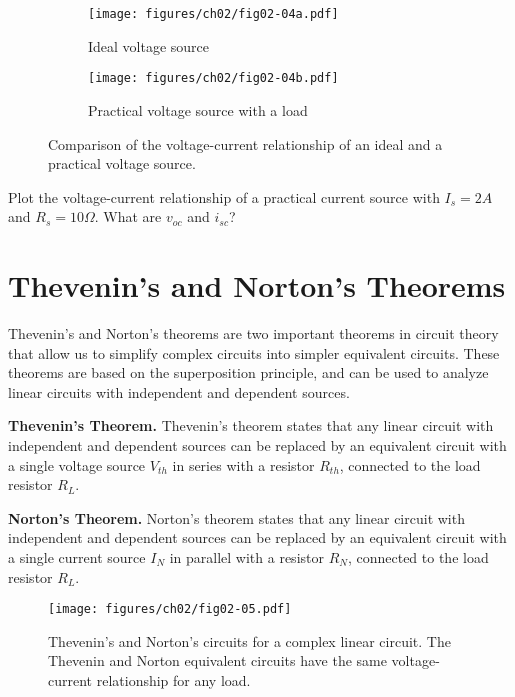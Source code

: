 \begin{figure}[t]
    \centering
    \begin{subfigure}{0.48\textwidth}
        \centering
        \texttt{[image: figures/ch02/fig02-04a.pdf]}
        \caption{Ideal voltage source}
        \label{fig:02-04a}
    \end{subfigure}
    \hfill
    \begin{subfigure}{0.48\textwidth}
        \centering
        \texttt{[image: figures/ch02/fig02-04b.pdf]}
        \caption{Practical voltage source with a load}
        \label{fig:02-04b}
    \end{subfigure}
    \caption{Comparison of the voltage-current relationship of an ideal and a practical voltage source.}
    \label{fig:02-04}
\end{figure}

\begin{boxedstuff}
    \begin{problem}
        Plot the voltage-current relationship of a practical current source with $I_s = 2A$ and $R_s = 10\Omega$. What are $v_{oc}$ and $i_{sc}$?
    \end{problem}
\end{boxedstuff}

\section{Thevenin's and Norton's Theorems}
Thevenin's and Norton's theorems are two important theorems in circuit theory that allow us to simplify complex circuits into simpler equivalent circuits. These theorems are based on the superposition principle, and can be used to analyze linear circuits with independent and dependent sources.

\noindent\textbf{Thevenin's Theorem.} Thevenin's theorem states that any linear circuit with independent and dependent sources can be replaced by an equivalent circuit with a single voltage source $V_{th}$ in series with a resistor $R_{th}$, connected to the load resistor $R_L$. 

\noindent\textbf{Norton's Theorem.} Norton's theorem states that any linear circuit with independent and dependent sources can be replaced by an equivalent circuit with a single current source $I_{N}$ in parallel with a resistor $R_{N}$, connected to the load resistor $R_L$.
\begin{figure}[t]
    \centering
    \texttt{[image: figures/ch02/fig02-05.pdf]}
    \caption{Thevenin's and Norton's circuits for a complex linear circuit. The Thevenin and Norton equivalent circuits have the same voltage-current relationship for any load.}
    \label{fig:02-05}
\end{figure}

